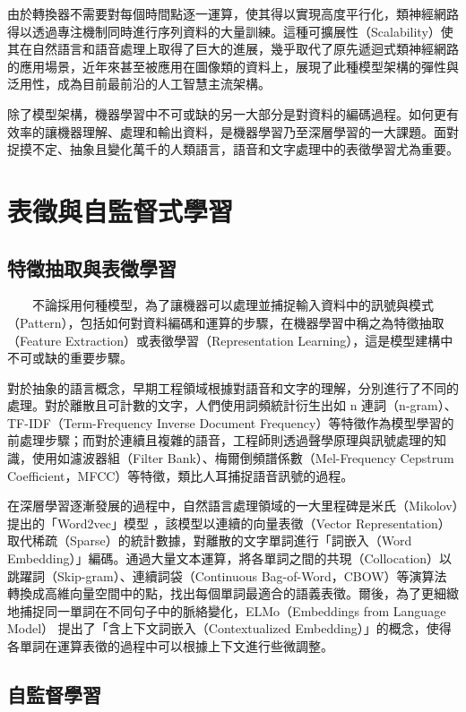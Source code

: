         由於轉換器不需要對每個時間點逐一運算，使其得以實現高度平行化，類神經網路得以透過專注機制同時進行序列資料的大量訓練。這種可擴展性（Scalability）使其在自然語言和語音處理上取得了巨大的進展，幾乎取代了原先遞迴式類神經網路的應用場景，近年來甚至被應用在圖像類的資料上\cite{dosovitskiy2021image}，展現了此種模型架構的彈性與泛用性，成為目前最前沿的人工智慧主流架構。

        除了模型架構，機器學習中不可或缺的另一大部分是對資料的編碼過程。如何更有效率的讓機器理解、處理和輸出資料，是機器學習乃至深層學習的一大課題。面對捉摸不定、抽象且變化萬千的人類語言，語音和文字處理中的表徵學習尤為重要。

\section{表徵與自監督式學習}

\subsection{特徵抽取與表徵學習}

　　不論採用何種模型，為了讓機器可以處理並捕捉輸入資料中的訊號與模式（Pattern），包括如何對資料編碼和運算的步驟，在機器學習中稱之為特徵抽取（Feature Extraction）或表徵學習（Representation Learning），這是模型建構中不可或缺的重要步驟。

        對於抽象的語言概念，早期工程領域根據對語音和文字的理解，分別進行了不同的處理。對於離散且可計數的文字，人們使用詞頻統計衍生出如 n 連詞（n-gram）、TF-IDF（Term-Frequency Inverse Document Frequency）等特徵作為模型學習的前處理步驟；而對於連續且複雜的語音，工程師則透過聲學原理與訊號處理的知識，使用如濾波器組（Filter Bank）、梅爾倒頻譜係數（Mel-Frequency Cepstrum Coefficient，MFCC）等特徵，類比人耳捕捉語音訊號的過程。

        在深層學習逐漸發展的過程中，自然語言處理領域的一大里程碑是米氏（Mikolov）提出的「Word2vec」模型 \cite{mikolov_efficient_2013}，該模型以連續的向量表徵（Vector Representation）取代稀疏（Sparse）的統計數據，對離散的文字單詞進行「詞嵌入（Word Embedding）」編碼。通過大量文本運算，將各單詞之間的共現（Collocation）以跳躍詞（Skip-gram）、連續詞袋（Continuous Bag-of-Word，CBOW）等演算法轉換成高維向量空間中的點，找出每個單詞最適合的語義表徵。爾後，為了更細緻地捕捉同一單詞在不同句子中的脈絡變化，ELMo（Embeddings from Language Model）\cite{peters_deep_2018} 提出了「含上下文詞嵌入（Contextualized Embedding）」的概念，使得各單詞在運算表徵的過程中可以根據上下文進行些微調整。

\subsection{自監督學習}

